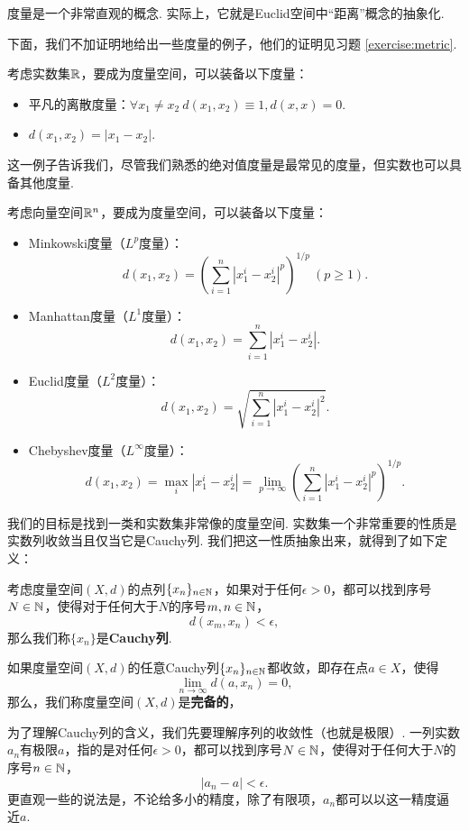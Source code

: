 度量是一个非常直观的概念. 实际上，它就是Euclid空间中“距离”概念的抽象化. 

下面，我们不加证明地给出一些度量的例子，他们的证明见习题 \ref{exercise:metric}.
\begin{example}\label{ex:metric}
    考虑实数集$\mathbb{R}$，要成为度量空间，可以装备以下度量：
    \begin{itemize}
            \item 平凡的离散度量：$\forall x_1\neq x_2\ d(x_1,x_2)\equiv 1, d(x,x)=0$. 
            \item $d(x_1,x_2)=|x_1-x_2|$. 
        \end{itemize}
        这一例子告诉我们，尽管我们熟悉的绝对值度量是最常见的度量，但实数也可以具备其他度量.

        考虑向量空间$\mathbb{R}^n$，要成为度量空间，可以装备以下度量：
        \begin{itemize}
            \item Minkowski度量（$L^p$度量）：
            \[d(x_1,x_2)=\left(\sum_{i=1}^n|x_1^i-x_2^i|^p\right)^{1/p}\ (p\geq 1).\] 
            \item Manhattan度量（$L^1$度量）：
            \[d(x_1,x_2)=\sum_{i=1}^n|x_1^i-x_2^i|.\]
            \item Euclid度量（$L^2$度量）：
            \[d(x_1,x_2)=\sqrt{\sum_{i=1}^n|x_1^i-x_2^i|^2}.\]
            \item Chebyshev度量（$L^\infty$度量）：
            \[d(x_1,x_2)=\max_i|x_1^i-x_2^i|=\lim_{p\to\infty}\left(\sum_{i=1}^n|x_1^i-x_2^i|^p\right)^{1/p}.\]
        \end{itemize}
\end{example}

我们的目标是找到一类和实数集非常像的度量空间. 实数集一个非常重要的性质是实数列收敛当且仅当它是Cauchy列. 我们把这一性质抽象出来，就得到了如下定义：

\begin{definition}
    考虑度量空间$(X,d)$的点列$\{x_n\}_{n\in \mathbb{N}}$，如果对于任何$\epsilon>0$，都可以找到序号$N\in\mathbb{N}$，使得对于任何大于$N$的序号$m,n\in\mathbb{N}$，
    \[d(x_m,x_n)<\epsilon,\]
    那么我们称$\{x_n\}$是\textbf{Cauchy列}.

    如果度量空间$(X,d)$的任意Cauchy列$\{x_n\}_{n\in \mathbb{N}}$都收敛，即存在点$a\in X$，使得
    \[\lim_{n\to\infty}d(a,x_n)=0,\]
    那么，我们称度量空间$(X,d)$是\textbf{完备的}，
\end{definition}

为了理解Cauchy列的含义，我们先要理解序列的收敛性（也就是极限）. 一列实数$a_n$有极限$a$，指的是对任何$\epsilon>0$，都可以找到序号$N\in\mathbb{N}$，使得对于任何大于$N$的序号$n\in\mathbb{N}$，
\[
    |a_n-a|<\epsilon.
\]
更直观一些的说法是，不论给多小的精度，除了有限项，$a_n$都可以以这一精度逼近$a$. 


